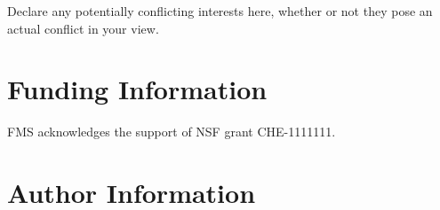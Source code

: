 \documentclass[9pt,tutorial]{livecoms}
\begin{document}
Declare any potentially conflicting interests here, whether or not they pose an actual conflict in your view.

\section*{Funding Information}
FMS acknowledges the support of NSF grant CHE-1111111.

\section*{Author Information}
\makeorcid




\end{document}
